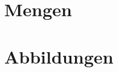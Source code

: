 \documentclass[a4paper,12pt, DIV12]{scrartcl}
\begin{document}

\newpage
\tableofcontents
\newpage
\section{Mengen}

\newpage

\newpage
\section{Abbildungen}

\newpage

\newpage

\newpage

\end{document}
